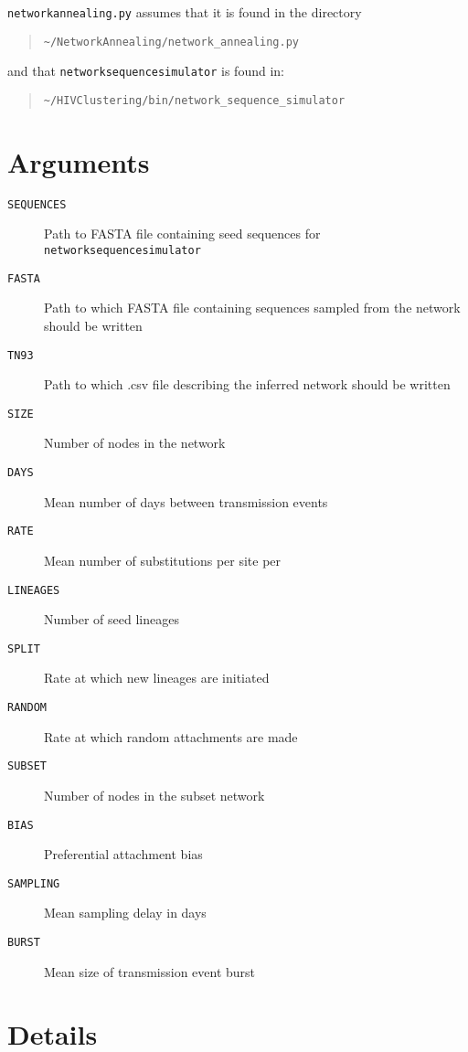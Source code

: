 \documentclass[12pt]{scrartcl}
\begin{document}
\texttt{network{\textunderscore}annealing.py} assumes that it is found in the directory 
\begin{quote}
\begin{verbatim}
~/NetworkAnnealing/network_annealing.py
\end{verbatim}
\end{quote}
 and that \texttt{network{\textunderscore}sequence{\textunderscore}simulator}  is found in:
 \begin{quote}
\begin{verbatim}
~/HIVClustering/bin/network_sequence_simulator
\end{verbatim}
\end{quote}

\section{Arguments}
\begin{description}
\item[\texttt{SEQUENCES}] Path to FASTA file containing seed sequences for \texttt{network{\textunderscore}sequence{\textunderscore}simulator}
\item[\texttt{FASTA}] Path to which FASTA file containing sequences sampled from the network should be written
\item[\texttt{TN93}] Path to which .csv file describing the inferred network should be written
\item[\texttt{SIZE}] Number of nodes in the network
\item[\texttt{DAYS}] Mean number of days between transmission events
\item[\texttt{RATE}] Mean number of substitutions per site per
\item[\texttt{LINEAGES}] Number of seed lineages
\item[\texttt{SPLIT}] Rate at which new lineages are initiated
\item[\texttt{RANDOM}] Rate at which random attachments are made
\item[\texttt{SUBSET}] Number of nodes in the subset network
\item[\texttt{BIAS}] Preferential attachment bias
\item[\texttt{SAMPLING}] Mean sampling delay in days
\item[\texttt{BURST}] Mean size of transmission event burst
\end{description}

\section{Details}
\end{document}
